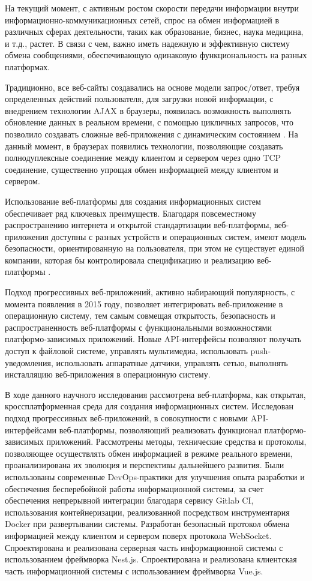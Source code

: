 \intro

На текущий момент, с активным ростом скорости передачи информации внутри информационно-коммуникационных сетей, спрос на обмен информацией в различных сферах деятельности, таких как образование, бизнес, наука медицина, и т.д., растет. В связи с чем, важно иметь надежную и эффективную систему обмена сообщениями, обеспечивающую одинаковую функциональность на разных платформах.

Традиционно, все веб-сайты создавались на основе модели запрос/ответ, требуя определенных действий пользователя, для загрузки новой информации, с внедрением технологии AJAX в браузеры, появилась возможность выполнять обновление данных в реальном времени, с помощью цикличных запросов, что позволило создавать сложные веб-приложения с динамическим состоянием \cite{RealtimeWebAppPhp}. На данный момент, в браузерах появились технологии, позволяющие создавать полнодуплексные соединение между клиентом и сервером через одно TCP соединение, существенно упрощая обмен информацией между клиентом и сервером.

Использование веб-платформы для создания информационных систем обеспечивает ряд ключевых преимуществ. Благодаря повсеместному распространению интернета и открытой стандартизации веб-платформы, веб-приложения доступны с разных устройств и операционных систем, имеют модель безопасности, ориентированную на пользователя, при этом не существует единой компании, которая бы контролировала спецификацию и реализацию веб-платформы \cite{webofthings}.

Подход прогрессивных веб-приложений, активно набирающий популярность, с момента появления в 2015 году, позволяет интегрировать веб-приложение в операционную систему, тем самым совмещая открытость, безопасность и распространенность веб-платформы с функциональными возможностями платформо-зависимых приложений. Новые API-интерфейсы позволяют получать доступ к файловой системе, управлять мультимедиа, использовать push-уведомления, использовать аппаратные датчики, управлять сетью, выполнять инсталляцию веб-приложения в операционную систему.

В ходе данного научного исследования рассмотрена веб-платформа, как открытая, кроссплатформенная среда для создания информационных систем.  Исследован подход прогрессивных веб-приложений, в совокупности с новыми API-интерфейсами веб-платформы, позволяющий реализовать функционал платформо-зависимых приложений. Рассмотрены методы, технические средства и протоколы, позволяющее осуществлять обмен информацией в режиме реального времени, проанализирована их эволюция и перспективы дальнейшего развития. Были использованы современные DevOps-практики для улучшения опыта разработки и обеспечения бесперебойной работы информационной системы, за счет обеспечения непрерывной интеграции благодаря сервису Gitlab CI, использования контейнеризации, реализованной посредством инструментария Docker при развертывании системы. Разработан безопасный протокол обмена информацией между клиентом и сервером поверх протокола WebSocket. Спроектирована и реализована серверная часть информационной системы с использованием фреймворка Nest.js. Спроектирована и реализована клиентская часть информационной системы с использованием фреймворка Vue.js.

